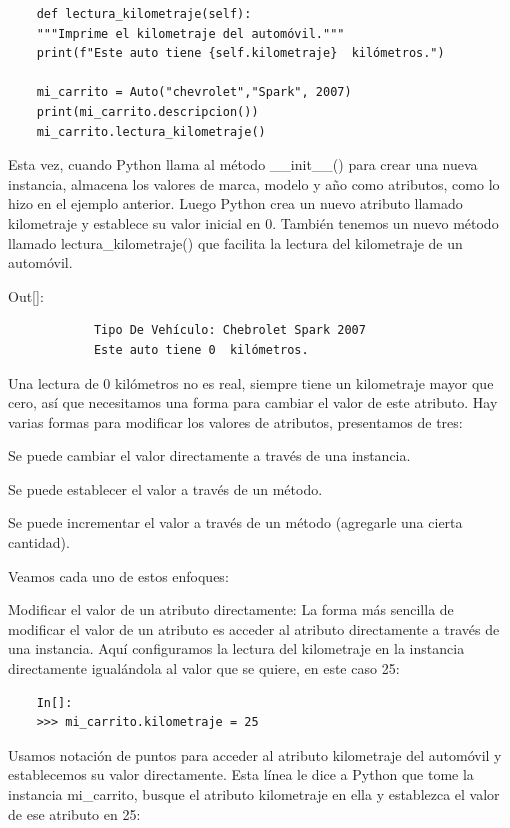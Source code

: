 {\begin{lstlisting}
	def lectura_kilometraje(self):
	"""Imprime el kilometraje del automóvil."""        
	print(f"Este auto tiene {self.kilometraje}  kilómetros.")
	
	mi_carrito = Auto("chevrolet","Spark", 2007)
	print(mi_carrito.descripcion())
	mi_carrito.lectura_kilometraje()
\end{lstlisting}

Esta vez, cuando Python llama al método {\ttfamily \_\!\_init\_\!\_()}  para crear una nueva instancia, almacena los valores de marca, modelo y año como atributos, como lo hizo en el ejemplo anterior. Luego Python crea un nuevo atributo llamado kilometraje y establece su valor inicial en 0. También tenemos un nuevo método llamado {\ttfamily lectura\_kilometraje()}  que facilita la lectura del kilometraje de un automóvil.\vspace{0.08cm}

{\ttfamily\scriptsize\noindent Out[]:\vspace{-0.3cm}	
	{\color{blue} 	
		\begin{verbatim}
			Tipo De Vehículo: Chebrolet Spark 2007
			Este auto tiene 0  kilómetros.
		\end{verbatim}
}}

Una lectura de 0 kilómetros no es real, siempre tiene un kilometraje mayor que cero, así que necesitamos una forma  para cambiar el valor de este atributo. Hay varias formas para modificar los valores de atributos, presentamos de tres:

Se puede cambiar el valor directamente a través de una instancia.

Se puede establecer el valor a través de un método.

Se puede incrementar el valor a través de un método (agregarle una cierta cantidad).


Veamos cada uno de estos enfoques:

Modificar el valor de un atributo directamente: La forma más sencilla de modificar el valor de un atributo es acceder al atributo directamente a través de una instancia. Aquí configuramos la lectura del kilometraje en la instancia  directamente igualándola al valor que se quiere, en este caso 25:

\begin{lstlisting}
	In[]:
	>>> mi_carrito.kilometraje = 25
\end{lstlisting}

Usamos notación de puntos para acceder al atributo kilometraje del automóvil y establecemos su valor directamente. Esta línea le dice a Python que tome la instancia {\ttfamily mi\_carrito}, busque el atributo kilometraje en  ella y establezca el valor de ese atributo en 25:

}
